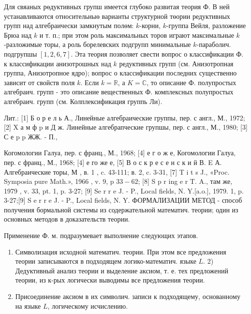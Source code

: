 \documentclass[10pt]{article}
\begin{document}
Для свяаных рөдуктивных групш имеется глубоко развитая теория Ф. В ней устанавливаются относительныө варианты структурной төории редуктивных групп над алгебраически замкнутым полөм: $k$-корни, $k$-группа Вейля, разложение Брюа над $k$ и т. п.; при этом роль максимальных торов играют максимальные $k$-разложимые торы, а роль борелевских подгрупп минимальные $k$-параболич. подгрупшы $[1,2,6,7]$. Эта теория позволяет свести вопрос о классификации Ф. к классификации анизотрошных над $k$ редуктивных групп (см. Анизотропная группа, Анизотропное ядро); вопрос о классификации последних существенно зависит от свойств поля $k$. Если $k=\mathbb{R}$, а $K=\mathbb{C}$, то описание Ф. полупростых алгебраич. групп - это описание вещественных Ф. комплексных полупростых алгебраич. групп (см. Колплексификация группь Ли).



Лит.: [1] Б о р е л ь А., Линейные алгебраические группы, пер. с англ., М., 1972; [2] X а м ф $\mathrm{p}$ и Д ж. Линейные алгебрапческие групшы, пер. с англ., М., 1980; [3] С е p p ЖЖ. - П.,

Когомологии Галуа, пер. с франц., М., 1968; [4] е г о ж е, Когомологии Галуа, пер. с франц., М., 1968; [4] е го же е, [5] В о с к р е с е н с к и й В. E А. Алгебраические торы, М , в. 1 , c. 43-111; в. 2, c. 3-31, [7] T i t s J., «Proc. Symposia pure Math.», 1966 , v. 9, p $33-62$; [8] S p r ing e r T. A., там же, 1979 , v. 33, pt. 1, p. 3-27; [9] Se r r e J. - P., Local fields, N. Y.[a.o.], 1979. 1, p. 3-27;[9] S e r r e J. - P., Local fields, N. Y. ФОРМАЛИЗАЦИИ МЕТОД - способ получения бормальной системы из содержательной математич. теории; один из основных методов в доказательств теории.



Применение Ф. м. подразумевает выполнение следующих этапов.



\begin{enumerate}

  \item Символизация исходноӥ математич. теории. При этом все предложения теории записываются в подходящем логико-математич. языке $L$. 2) Дедуктивный анализ теории и выделение аксиом, т. е. тех предложений теории, из к-рых логически выводимы все предложения теории.



  \item Присоединение аксиом в их символич. записи к подходящему, основанному на языке $L$, логическому исчислению.



\end{enumerate}
\end{document}

